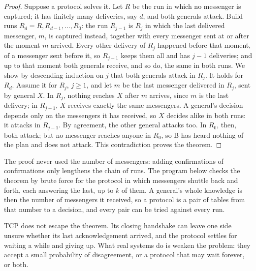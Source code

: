 \begin{proof}
Suppose a protocol solves it. Let $R$ be the run in which no messenger is captured; it has finitely many deliveries, say $d$, and both generals attack. Build runs $R_d = R, R_{d-1}, \ldots, R_0$: the run $R_{j-1}$ is $R_j$ in which the last delivered messenger, $m$, is captured instead, together with every messenger sent at or after the moment $m$ arrived. Every other delivery of $R_j$ happened before that moment, of a messenger sent before it, so $R_{j-1}$ keeps them all and has $j - 1$ deliveries; and up to that moment both generals receive, and so do, the same in both runs. We show by descending induction on $j$ that both generals attack in $R_j$. It holds for $R_d$. Assume it for $R_j$, $j \ge 1$, and let $m$ be the last messenger delivered in $R_j$, sent by general $X$. In $R_j$, nothing reaches $X$ after $m$ arrives, since $m$ is the last delivery; in $R_{j-1}$, $X$ receives exactly the same messengers. A general's decision depends only on the messengers it has received, so $X$ decides alike in both runs: it attacks in $R_{j-1}$. By agreement, the other general attacks too. In $R_0$, then, both attack; but no messenger reaches anyone in $R_0$, so B has heard nothing of the plan and does not attack. This contradiction proves the theorem.
\end{proof}

The proof never used the number of messengers: adding confirmations of confirmations only lengthens the chain of runs. The program below checks the theorem by brute force for the protocol in which messengers shuttle back and forth, each answering the last, up to $k$ of them. A general's whole knowledge is then the number of messengers it received, so a protocol is a pair of tables from that number to a decision, and every pair can be tried against every run.

\label{lst:b3:distributed-systems:generals}

\label{out:b3:distributed-systems:generals}

TCP does not escape the theorem. Its closing handshake can leave one side unsure whether its last acknowledgement arrived, and the protocol settles for waiting a while and giving up. What real systems do is weaken the problem: they accept a small probability of disagreement, or a protocol that may wait forever, or both.

